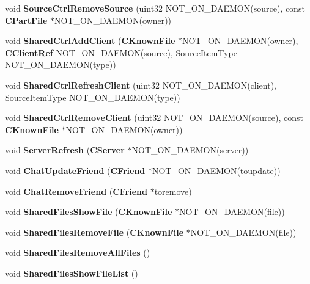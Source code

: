 \begin{DoxyCompactItemize}
\item 
void {\bfseries SourceCtrlRemoveSource} (uint32 NOT\_\-ON\_\-DAEMON(source), const {\bf CPartFile} $\ast$NOT\_\-ON\_\-DAEMON(owner))\label{namespaceMuleNotify_a06ee422c6fecd1b76373c9021a24dc39}

\item 
void {\bfseries SharedCtrlAddClient} ({\bf CKnownFile} $\ast$NOT\_\-ON\_\-DAEMON(owner), {\bf CClientRef} NOT\_\-ON\_\-DAEMON(source), SourceItemType NOT\_\-ON\_\-DAEMON(type))\label{namespaceMuleNotify_ad976326caba6a40031e16191e7412c10}

\item 
void {\bfseries SharedCtrlRefreshClient} (uint32 NOT\_\-ON\_\-DAEMON(client), SourceItemType NOT\_\-ON\_\-DAEMON(type))\label{namespaceMuleNotify_a7e3b76442d28e924bef39bd04bc768b1}

\item 
void {\bfseries SharedCtrlRemoveClient} (uint32 NOT\_\-ON\_\-DAEMON(source), const {\bf CKnownFile} $\ast$NOT\_\-ON\_\-DAEMON(owner))\label{namespaceMuleNotify_a68ebc9c3a51d860093caa7cdde307f3e}

\item 
void {\bfseries ServerRefresh} ({\bf CServer} $\ast$NOT\_\-ON\_\-DAEMON(server))\label{namespaceMuleNotify_a4f5d0e88f49695a772148db471692218}

\item 
void {\bfseries ChatUpdateFriend} ({\bf CFriend} $\ast$NOT\_\-ON\_\-DAEMON(toupdate))\label{namespaceMuleNotify_a0fb1b4447e67479473a04f4f22414470}

\item 
void {\bfseries ChatRemoveFriend} ({\bf CFriend} $\ast$toremove)\label{namespaceMuleNotify_a2dd77c326ec129ed3dc456ae0173060e}

\item 
void {\bfseries SharedFilesShowFile} ({\bf CKnownFile} $\ast$NOT\_\-ON\_\-DAEMON(file))\label{namespaceMuleNotify_a17631f83273169f346b32799e80370fb}

\item 
void {\bfseries SharedFilesRemoveFile} ({\bf CKnownFile} $\ast$NOT\_\-ON\_\-DAEMON(file))\label{namespaceMuleNotify_a812365497b4ab93bb53c129fec4aa54d}

\item 
void {\bfseries SharedFilesRemoveAllFiles} ()\label{namespaceMuleNotify_aeebf017bd24613b9b1cc864843330563}

\item 
void {\bfseries SharedFilesShowFileList} ()\label{namespaceMuleNotify_a5e7e871c8c76115ef2866848f95a4b5c}


\end{DoxyCompactItemize}
